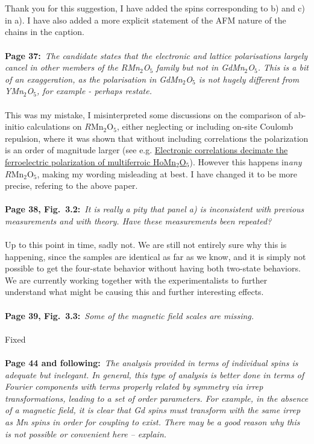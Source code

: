 \documentclass[a4, UTF8]{article}
\begin{document}
\\\\
Thank you for this suggestion, I have added the spins corresponding to b) and c) in a).
I have also added a more explicit statement of the AFM nature of the chains in the caption.
\\\\
{\bf Page 37:}~{\it The candidate states that the electronic and lattice polarisations largely cancel in other members of the $R$Mn$_2$O$_5$ family but not in GdMn$_2$O$_5$. This is a bit of an exaggeration, as the polarisation in GdMn$_2$O$_5$ is not hugely different from YMn$_2$O$_5$, for example - perhaps restate.}
\\\\
This was my mistake, I misinterpreted some discussions on the comparison of ab-initio calculations on $R$Mn$_2$O$_5$, either neglecting or including on-site Coulomb repulsion, where it was shown that without including correlations the polarization is an order of magnitude larger (see e.g. \href{https://arxiv.org/abs/0802.0653v1}{Electronic correlations decimate the ferroelectric polarization of multiferroic HoMn$_2$O$_5$}). However this happens in{\it any} $R$Mn$_2$O$_5$, making my wording misleading at best. I have changed it to be more precise, refering to the above paper. 
\\\\
{\bf Page 38, Fig.~3.2:}~{\it It is really a pity that panel a) is inconsistent with previous measurements and with theory. Have these measurements been repeated?}
\\\\
Up to this point in time, sadly not. We are still not entirely sure why this is happening, since the samples are identical as far as we know, and it is simply not possible to get the four-state behavior without having both two-state behaviors. We are currently working together with the experimentalists to further understand what might be causing this and further interesting effects.
\\\\
{\bf Page 39, Fig.~3.3:}~{\it Some of the magnetic field scales are missing.}
\\\\
Fixed
\\\\
{\bf Page 44 and following:}~{\it The analysis provided in terms of individual spins is adequate but
inelegant. In general, this type of analysis is better done in terms of Fourier components with
terms properly related by symmetry via irrep transformations, leading to a set of order parameters.
For example, in the absence of a magnetic field, it is clear that Gd spins must transform with the
same irrep as Mn spins in order for coupling to exist. There may be a good reason why this is not
possible or convenient here – explain.}
\end{document}
